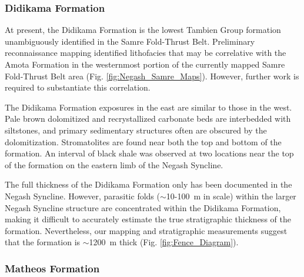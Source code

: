 \documentclass[11pt,letterpaper]{article}
\begin{document}
\subsubsection*{Didikama Formation}

At present, the Didikama Formation is the lowest Tambien Group formation unambiguously identified in the Samre Fold-Thrust Belt. Preliminary reconnaissance mapping identified lithofacies that may be correlative with the Amota Formation in the westernmost portion of the currently mapped Samre Fold-Thrust Belt area (Fig. \ref{fig:Negash_Samre_Maps}). However, further work is required to substantiate this correlation.

The Didikama Formation exposures in the east are similar to those in the west. Pale brown dolomitized and recrystallized carbonate beds are interbedded with siltstones, and primary sedimentary structures often are obscured by the dolomitization. Stromatolites are found near both the top and bottom of the formation. An interval of black shale was observed at two locations near the top of the formation on the eastern limb of the Negash Syncline.

The full thickness of the Didikama Formation only has been documented in the Negash Syncline. However, parasitic folds ($\sim$10-100~m in scale) within the larger Negash Syncline structure are concentrated within the Didikama Formation, making it difficult to accurately estimate the true stratigraphic thickness of the formation. Nevertheless, our mapping and stratigraphic measurements suggest that the formation is $\sim$1200~m thick (Fig. \ref{fig:Fence_Diagram}).

\subsubsection*{Matheos Formation}
\end{document}
